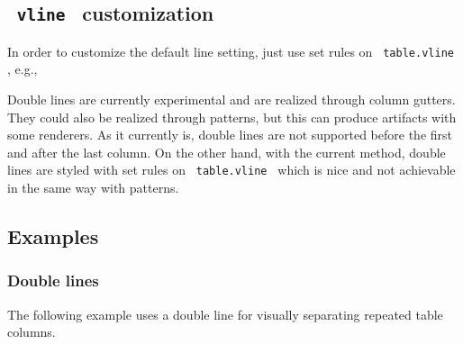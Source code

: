 \subsection{\texorpdfstring{\texttt{\ vline\ }
customization}{ vline  customization}}\label{vline-customization}

In order to customize the default line setting, just use set rules on
\texttt{\ table.vline\ } , e.g.,

\begin{Shaded}
\begin{Highlighting}[]

\end{Highlighting}
\end{Shaded}

Double lines are currently experimental and are realized through column
gutters. They could also be realized through patterns, but this can
produce artifacts with some renderers. As it currently is, double lines
are not supported before the first and after the last column. On the
other hand, with the current method, double lines are styled with set
rules on \texttt{\ table.vline\ } which is nice and not achievable in
the same way with patterns.

\subsection{Examples}\label{examples}

\subsubsection{Double lines}\label{double-lines}

The following example uses a double line for visually separating
repeated table columns.

\begin{Shaded}
\begin{Highlighting}[]
  
\NormalTok{  [1], [34.3], [11.1],  [6], [34.0], [12.9],}
\NormalTok{  [2], [34.2], [11.2],  [7], [34.3], [12.8],}
\NormalTok{  [3], [34.6], [11.4],  [8], [33.9], [11.9],}
\NormalTok{  [4], [34.7], [10.3],  [9], [34.4], [11.8],}
\NormalTok{  [5], [34.3], [11.1], [10], [34.4], [11.8],}
\NormalTok{)}
\end{Highlighting}
\end{Shaded}

